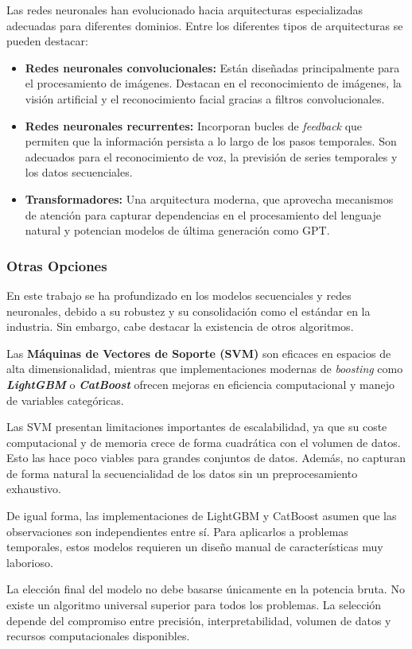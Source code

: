 Las redes neuronales han evolucionado hacia arquitecturas especializadas adecuadas para diferentes dominios. Entre los diferentes tipos de arquitecturas se pueden destacar:
\begin{itemize}
	\item \textbf{Redes neuronales convolucionales:} Están diseñadas principalmente para el procesamiento de imágenes. Destacan en el reconocimiento de imágenes, la visión artificial y el reconocimiento facial gracias a filtros convolucionales.
	\item \textbf{Redes neuronales recurrentes:} Incorporan bucles de \textit{feedback} que permiten que la información persista a lo largo de los pasos temporales. Son adecuados para el reconocimiento de voz, la previsión de series temporales y los datos secuenciales.
	\item \textbf{Transformadores:} Una arquitectura moderna, que aprovecha mecanismos de atención para capturar dependencias en el procesamiento del lenguaje natural y potencian modelos de última generación como GPT.
\end{itemize}

\subsubsection{Otras Opciones}
En este trabajo se ha profundizado en los modelos secuenciales y redes neuronales, debido a su robustez y su consolidación como el estándar en la industria. Sin embargo, cabe destacar la existencia de otros algoritmos. 

Las \textbf{Máquinas de Vectores de Soporte (SVM)} son eficaces en espacios de alta dimensionalidad, mientras que implementaciones modernas de \textit{boosting} como \textit{\textbf{LightGBM}} o \textit{\textbf{CatBoost}} ofrecen mejoras en eficiencia computacional y manejo de variables categóricas.

Las SVM presentan limitaciones importantes de escalabilidad, ya que su coste computacional y de memoria crece de forma cuadrática con el volumen de datos. Esto las hace poco viables para grandes conjuntos de datos. Además, no capturan de forma natural la secuencialidad de los datos sin un preprocesamiento exhaustivo. 

De igual forma, las implementaciones de LightGBM y CatBoost asumen que las observaciones son independientes entre sí. Para aplicarlos a problemas temporales, estos modelos requieren un diseño manual de características muy laborioso.

La elección final del modelo no debe basarse únicamente en la potencia bruta. No existe un algoritmo universal superior para todos los problemas. La selección depende del compromiso entre precisión, interpretabilidad, volumen de datos y recursos computacionales disponibles.

